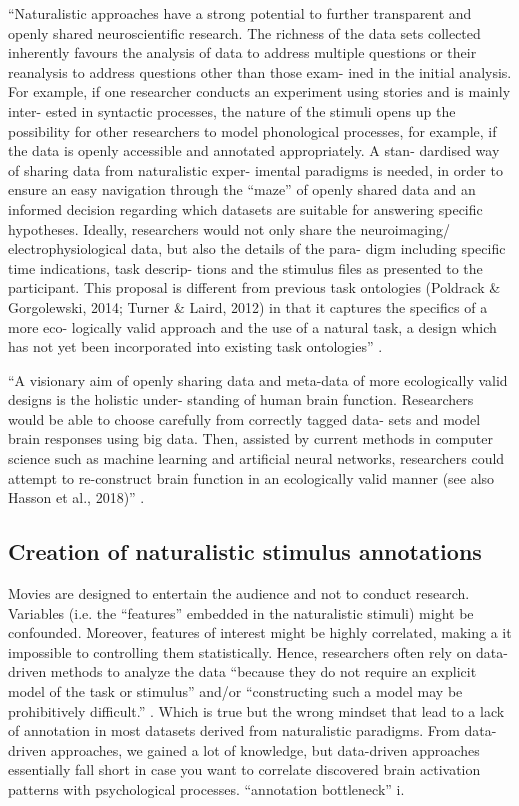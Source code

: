 ``Naturalistic approaches have a strong potential to further transparent and
openly shared neuroscientiﬁc research.  The richness of the data sets collected
inherently favours the analysis of data to address multiple questions or their
reanalysis to address questions other than those exam- ined in the initial
analysis. For example, if one researcher conducts an experiment using stories
and is mainly inter- ested in syntactic processes, the nature of the stimuli
opens up the possibility for other researchers to model phonological processes,
for example, if the data is openly accessible and annotated appropriately. A
stan- dardised way of sharing data from naturalistic exper- imental paradigms is
needed, in order to ensure an easy navigation through the “maze” of openly
shared data and an informed decision regarding which datasets are suitable for
answering speciﬁc hypotheses. Ideally, researchers would not only share the
neuroimaging/ electrophysiological data, but also the details of the para- digm
including speciﬁc time indications, task descrip- tions and the stimulus ﬁles as
presented to the participant. This proposal is diﬀerent from previous task
ontologies (Poldrack \& Gorgolewski, 2014; Turner \& Laird, 2012) in that it
captures the speciﬁcs of a more eco- logically valid approach and the use of a
natural task, a design which has not yet been incorporated into existing task
ontologies'' \citep{kandylaki2019story}.

%
``A visionary aim of openly sharing data and meta-data of more ecologically
valid designs is the holistic under- standing of human brain function.
Researchers would be able to choose carefully from correctly tagged data- sets
and model brain responses using big data. Then, assisted by current methods in
computer science such as machine learning and artiﬁcial neural networks,
researchers could attempt to re-construct brain function in an ecologically
valid manner (see also Hasson et al., 2018)'' \citep{kandylaki2019story}.


\subsection{Creation of naturalistic stimulus annotations}

%
Movies are designed to entertain the audience and not to conduct research.
%
Variables (i.e. the ``features'' embedded in the naturalistic stimuli) might be
confounded.
%
Moreover, features of interest might be highly correlated, making a it
impossible to controlling them statistically.
%
Hence, researchers often rely on data-driven methods to analyze the data
``because they do not require an explicit model of the task or stimulus'' and/or
``constructing such a model may be prohibitively difficult.''
\citep{nastase2019measuring}.
%
Which is true but the wrong mindset that lead to a lack of annotation in most
datasets derived from naturalistic paradigms.
%
From data-driven approaches, we gained a lot of knowledge, but data-driven
approaches essentially fall short in case you want to correlate discovered brain
activation patterns with psychological processes.
%
``annotation bottleneck'' \citep{aliko2020naturalistic}i.

